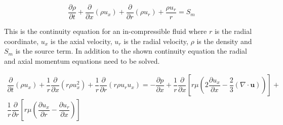 \documentclass[../thesis.tex]{subfiles}
\begin{document}
\begin{equation}
\label{eqn:ansys_conti}
\dfrac{\partial \rho}{\partial t} + \dfrac{\partial}{\partial x} (\rho u_x) + \dfrac{\partial }{\partial r} (\rho u_r)
+ \dfrac{\rho u_r}{r} = S_m
\end{equation}

This is the continuity equation for an in-compressible fluid where $r$ is the radial coordinate, $u_x$ is the axial velocity, $u_r$ is the radial velocity, $\rho$ is the density and $S_m$ is the source term. In addition to the shown continuity equation the radial and axial momentum equations need to be solved.


\begin{gather}
	\dfrac{\partial}{\partial t}(\rho u_x) + \dfrac{1}{r} \dfrac{\partial}{\partial x}(r \rho u_x^2)
	+ \dfrac{1}{r} \dfrac{\partial}{\partial r}(r \rho u_r u_x) = 
	- \dfrac{\partial p}{\partial x} + \dfrac{1}{r} \dfrac{\partial }{\partial x} \left[ 
	r \mu \left( 2 \dfrac{\partial u_x}{\partial x} - \dfrac{2}{3}(\nabla \cdot \mathbf{u}) \right)
	\right] + \\ \nonumber
	\dfrac{1}{r} \dfrac{\partial }{\partial r} \left[ 
	r \mu \left( \dfrac{\partial u_x}{\partial r} - \dfrac{\partial u_r}{\partial x} \right)
	\right]	
\end{gather}

\end{document}
